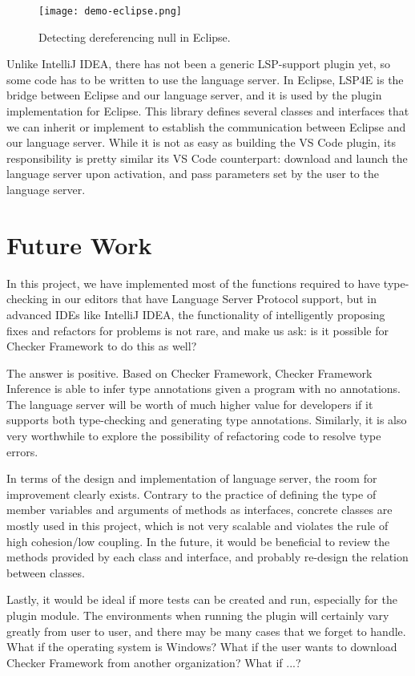 \documentclass{article}
\begin{document}
\begin{figure}
\centering
\texttt{[image: demo-eclipse.png]}
\caption{Detecting dereferencing null in Eclipse.}
\label{fig:demo-eclipse}
\end{figure}

Unlike IntelliJ IDEA, there has not been a generic LSP-support plugin yet, so
some code has to be written to use the language server. In Eclipse, LSP4E is the
bridge between Eclipse and our language server, and it is used by the plugin
implementation for Eclipse. This library defines several classes and interfaces
that we can inherit or implement to establish the communication between Eclipse
and our language server. While it is not as easy as building the VS Code plugin,
its responsibility is pretty similar its VS Code counterpart: download and
launch the language server upon activation, and pass parameters set by the user
to the language server.


\section{Future Work}

In this project, we have implemented most of the functions required to have
type-checking in our editors that have Language Server Protocol support, but in
advanced IDEs like IntelliJ IDEA, the functionality of intelligently proposing
fixes and refactors for problems is not rare, and make us ask: is it possible
for Checker Framework to do this as well?

The answer is positive. Based on Checker Framework, Checker Framework
Inference\cite{cfi}\cite{cfirepo} is able to infer type annotations given a
program with no annotations. The language server will be worth of much higher
value for developers if it supports both type-checking and generating type
annotations. Similarly, it is also very worthwhile to explore the possibility of
refactoring code to resolve type errors.

In terms of the design and implementation of language server, the room for
improvement clearly exists. Contrary to the practice of defining the type of
member variables and arguments of methods as interfaces, concrete classes are
mostly used in this project, which is not very scalable and violates the rule of
high cohesion/low coupling. In the future, it would be beneficial to review the
methods provided by each class and interface, and probably re-design the
relation between classes.

Lastly, it would be ideal if more tests can be created and run, especially for
the plugin module. The environments when running the plugin will certainly vary
greatly from user to user, and there may be many cases that we forget to handle.
What if the operating system is Windows? What if the user wants to download
Checker Framework from another organization? What if ...?
\end{document}
